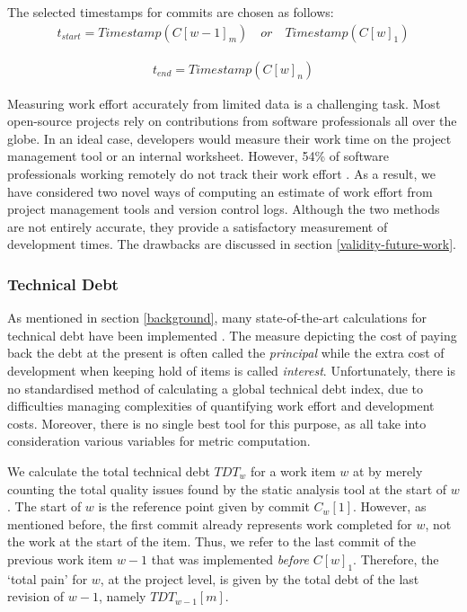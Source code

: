 \documentclass{mpaper}
\begin{document}
The selected timestamps for commits are chosen as follows:
\begin{equation}
  \label{eq-commit-start}
  \begin{aligned}
    t_{start} = Timestamp(C[w-1]_{m}) \quad or \quad Timestamp(C[w]_{1})
  \end{aligned}
\end{equation}

\begin{equation}
  \label{eq-commit-end}
  \begin{aligned}
    t_{end} = Timestamp(C[w]_{n})
  \end{aligned}
\end{equation}

Measuring work effort accurately from limited data is a challenging task. Most
open-source projects rely on contributions from software professionals all over
the globe. In an ideal case, developers would measure their work time on the
project management tool or an internal worksheet. However, 54\% of software
professionals working remotely do not track their work effort
\cite{DeveloperSurvey2018}. As a result, we have considered two novel ways of
computing an estimate of work effort from project management tools and version
control logs. Although the two methods are not entirely accurate, they provide a
satisfactory measurement of development times. The drawbacks are discussed in
section \ref{validity-future-work}.

\subsubsection*{Technical Debt}

As mentioned in section \ref{background}, many state-of-the-art calculations for
technical debt have been implemented \cite{Letouzey2012} \cite{Nugroho2011}
\cite{Fontana2016}. The measure depicting the cost of paying back the debt at
the present is often called the \emph{principal} while the extra cost of
development when keeping hold of items is called \emph{interest}. Unfortunately,
there is no standardised method of calculating a global technical debt index,
due to difficulties managing complexities of quantifying work effort and
development costs. Moreover, there is no single best tool for this purpose, as
all take into consideration various variables for metric computation. 

We calculate the total technical debt $TDT_{w}$ for a work item $w$ at by merely
counting the total quality issues found by the static analysis tool at the start
of $w$. The start of $w$ is the reference point given by commit $C_{w}[1]$.
However, as mentioned before, the first commit already represents work completed
for $w$, not the work at the start of the item. Thus, we refer to the last
commit of the previous work item $w-1$ that was implemented \emph{before}
$C[w]_{1}$. Therefore, the `total pain' for $w$, at the project level, is given
by the total debt of the last revision of $w-1$, namely $TDT_{w-1}[m]$.
\end{document}
